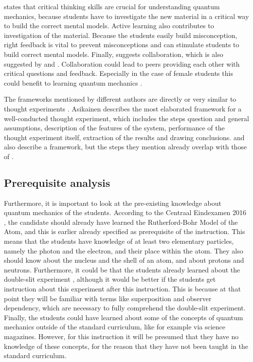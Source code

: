 \documentclass[11pt,twoside]{report} %
\begin{document}
 states that critical thinking skills are crucial for understanding quantum mechanics, because students have to investigate the new material in a critical way to build the correct mental models. Active learning also contributes to investigation of the material. Because the students easily build misconception, right feedback is vital to prevent misconceptions and can stimulate students to build correct mental models. Finally,  suggests collaboration, which is also suggested by  and . Collaboration could lead to peers providing each other with critical questions and feedback. Especially in the case of female students this could benefit to learning quantum mechanics \cite{adegoke}. 

The frameworks mentioned by different authors are directly or very similar to thought experiments \cite{asikainen, erduran, levrini, velentzas}. Asikainen describes the most elaborated framework for a well-conducted thought experiment, which includes the steps question and general assumptions, description of the features of the system, performance of the thought experiment itself, extraction of the results and drawing conclusions.  and  also describe a framework, but the steps they mention already overlap with those of .

\subsection{Prerequisite analysis}

Furthermore, it is important to look at the pre-existing knowledge about quantum mechanics of the students. According to the Centraal Eindexamen 2016 \cite{eindexamen2016}, the candidate should already have learned the Rutherford-Bohr Model of the Atom, and this is earlier already specified as prerequisite of the instruction. This means that the students have knowledge of at least two elementary particles, namely the photon and the electron, and their place within the atom. They also should know about the nucleus and the shell of an atom, and about protons and neutrons. Furthermore, it could be that the students already learned about the double-slit experiment \cite{eindexamen2015}, although it would be better if the students get instruction about this experiment after this instruction. This is because at that point they will be familiar with terms like superposition and observer dependency, which are necessary to fully comprehend the double-slit experiment. Finally, the students could have learned about some of the concepts of quantum mechanics outside of the standard curriculum, like for example via science magazines. However, for this instruction it will be presumed that they have no knowledge of these concepts, for the reason that they have not been taught in the standard curriculum.
\end{document}
